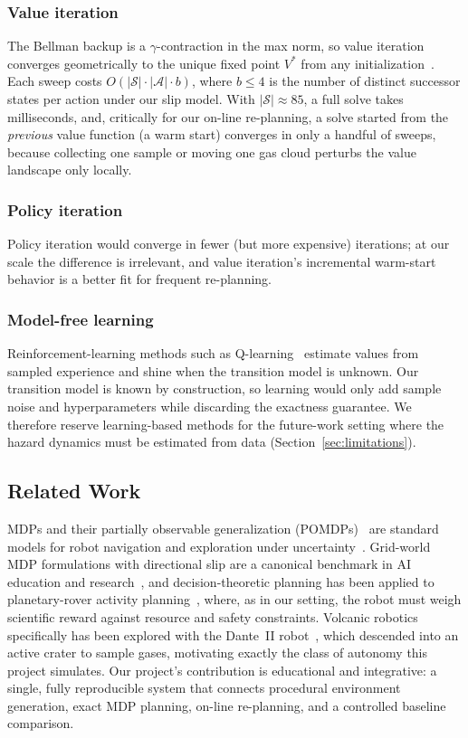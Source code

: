 \documentclass[conference]{IEEEtran}
\begin{document}
\subsubsection{Value iteration} The Bellman backup is a $\gamma$-contraction in the max norm, so value iteration converges geometrically to the unique fixed point $V^{*}$ from any initialization~\cite{puterman1994}. Each sweep costs $O(|\mathcal{S}| \cdot |\mathcal{A}| \cdot b)$, where $b \le 4$ is the number of distinct successor states per action under our slip model. With $|\mathcal{S}| \approx 85$, a full solve takes milliseconds, and, critically for our on-line re-planning, a solve started from the \emph{previous} value function (a warm start) converges in only a handful of sweeps, because collecting one sample or moving one gas cloud perturbs the value landscape only locally.

\subsubsection{Policy iteration} Policy iteration would converge in fewer (but more expensive) iterations; at our scale the difference is irrelevant, and value iteration's incremental warm-start behavior is a better fit for frequent re-planning.

\subsubsection{Model-free learning} Reinforcement-learning methods such as Q-learning~\cite{suttonbarto2018} estimate values from sampled experience and shine when the transition model is unknown. Our transition model is known by construction, so learning would only add sample noise and hyperparameters while discarding the exactness guarantee. We therefore reserve learning-based methods for the future-work setting where the hazard dynamics must be estimated from data (Section~\ref{sec:limitations}).

\subsection{Related Work}

MDPs and their partially observable generalization (POMDPs)~\cite{kaelbling1998} are standard models for robot navigation and exploration under uncertainty~\cite{thrun2005, lavalle2006}. Grid-world MDP formulations with directional slip are a canonical benchmark in AI education and research~\cite{russellnorvig2021}, and decision-theoretic planning has been applied to planetary-rover activity planning~\cite{bresina2002}, where, as in our setting, the robot must weigh scientific reward against resource and safety constraints. Volcanic robotics specifically has been explored with the Dante~II robot~\cite{bares1999dante}, which descended into an active crater to sample gases, motivating exactly the class of autonomy this project simulates. Our project's contribution is educational and integrative: a single, fully reproducible system that connects procedural environment generation, exact MDP planning, on-line re-planning, and a controlled baseline comparison.
\end{document}
